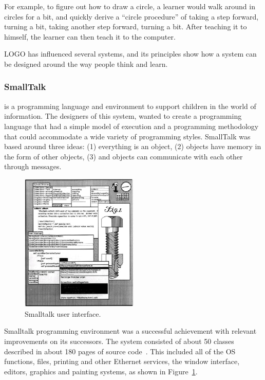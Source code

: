 For example, to figure out how to draw a circle, a learner would walk around in circles for a bit, and quickly derive a ``circle procedure'' of taking a step forward, turning a bit, taking another step forward, turning a bit. After teaching it to himself, the learner can then teach it to the computer. 

LOGO has influenced several systems, and its principles show how a system can be designed around the way people think and learn.
\subsubsection{SmallTalk~\cite{Kay1993}} is a programming language and environment to support children in the world of information. The designers of this system, wanted to create a programming language that had a simple model of execution and a programming methodology that could accommodate a wide variety of programming styles. SmallTalk was based around three ideas: (1) everything is an object, (2) objects have memory in the form of other objects, (3) and objects can communicate with each other through messages.

\begin{figure}
\vspace{-20pt}
  \centering
  \includegraphics[width=0.5\textwidth]{img/smalltalk}
    \vspace{-15pt}
    \caption{Smalltalk user interface.}
    \vspace{-20pt}  
  \label{fig:smalltalk}
\end{figure} 

Smalltalk programming environment was a successful achievement with relevant improvements on its successors. The system consisted of about 50 classes described in about 180 pages of source code~\cite{Kay1993}. This included all of the OS functions, files, printing and other Ethernet services, the window interface, editors, graphics and painting systems, as shown in Figure~\ref{fig:smalltalk}. 

